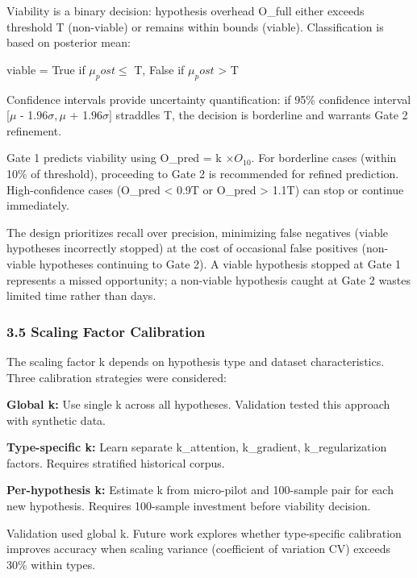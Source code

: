 Viability is a binary decision: hypothesis overhead O\_full either exceeds threshold T (non-viable) or remains within bounds (viable). Classification is based on posterior mean:

viable = True if $\mu _post \leq$ T, False if $\mu _post$ > T

Confidence intervals provide uncertainty quantification: if 95\% confidence interval [$\mu$ - 1.$96\sigma, \mu$ + 1.$96\sigma ]$ straddles T, the decision is borderline and warrants Gate 2 refinement.

Gate 1 predicts viability using O\_pred = k $\times O_{10}$. For borderline cases (within 10\% of threshold), proceeding to Gate 2 is recommended for refined prediction. High-confidence cases (O\_pred < 0.9T or O\_pred > 1.1T) can stop or continue immediately.

The design prioritizes recall over precision, minimizing false negatives (viable hypotheses incorrectly stopped) at the cost of occasional false positives (non-viable hypotheses continuing to Gate 2). A viable hypothesis stopped at Gate 1 represents a missed opportunity; a non-viable hypothesis caught at Gate 2 wastes limited time rather than days.

\subsubsection{3.5 Scaling Factor Calibration}

The scaling factor k depends on hypothesis type and dataset characteristics. Three calibration strategies were considered:

\textbf{Global k:} Use single k across all hypotheses. Validation tested this approach with synthetic data.

\textbf{Type-specific k:} Learn separate k\_attention, k\_gradient, k\_regularization factors. Requires stratified historical corpus.

\textbf{Per-hypothesis k:} Estimate k from micro-pilot and 100-sample pair for each new hypothesis. Requires 100-sample investment before viability decision.

Validation used global k. Future work explores whether type-specific calibration improves accuracy when scaling variance (coefficient of variation CV) exceeds 30\% within types.
